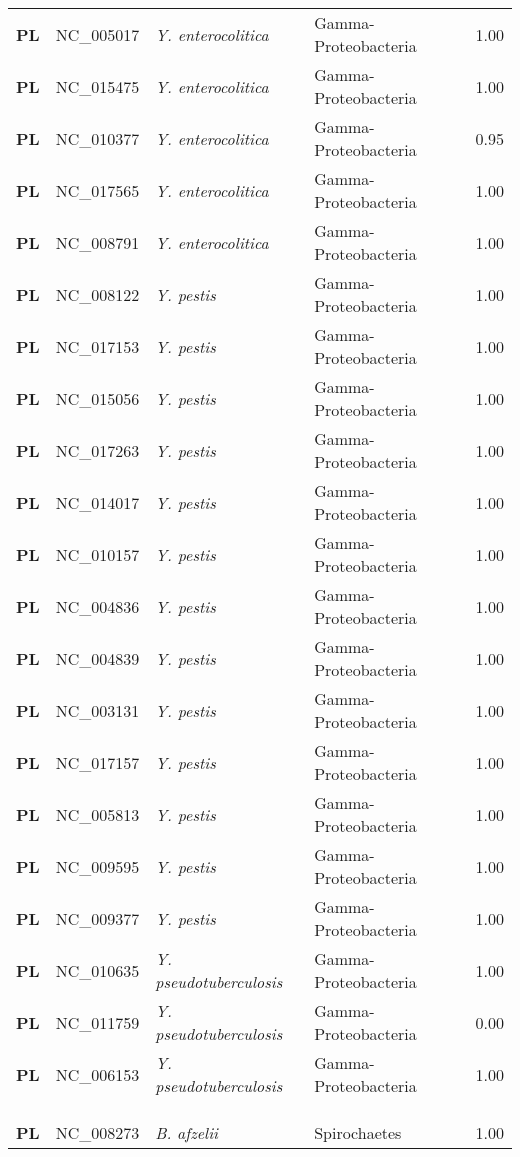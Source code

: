 \begin{adjustwidth}{-3cm}{2cm}
{\begin{supertabular}{>{\bfseries}l|p{0.1\textwidth}p{0.14\textwidth}l|l}
PL & NC\_005017 & \textit{Y. enterocolitica} & Gamma-Proteobacteria & 1.00\\
PL & NC\_015475 & \textit{Y. enterocolitica} & Gamma-Proteobacteria & 1.00\\
PL & NC\_010377 & \textit{Y. enterocolitica} & Gamma-Proteobacteria & 0.95\\
PL & NC\_017565 & \textit{Y. enterocolitica} & Gamma-Proteobacteria & 1.00\\
PL & NC\_008791 & \textit{Y. enterocolitica} & Gamma-Proteobacteria & 1.00\\
PL & NC\_008122 & \textit{Y. pestis} & Gamma-Proteobacteria & 1.00\\
PL & NC\_017153 & \textit{Y. pestis} & Gamma-Proteobacteria & 1.00\\
PL & NC\_015056 & \textit{Y. pestis} & Gamma-Proteobacteria & 1.00\\
PL & NC\_017263 & \textit{Y. pestis} & Gamma-Proteobacteria & 1.00\\
PL & NC\_014017 & \textit{Y. pestis} & Gamma-Proteobacteria & 1.00\\
PL & NC\_010157 & \textit{Y. pestis} & Gamma-Proteobacteria & 1.00\\
PL & NC\_004836 & \textit{Y. pestis} & Gamma-Proteobacteria & 1.00\\
PL & NC\_004839 & \textit{Y. pestis} & Gamma-Proteobacteria & 1.00\\
PL & NC\_003131 & \textit{Y. pestis} & Gamma-Proteobacteria & 1.00\\
PL & NC\_017157 & \textit{Y. pestis} & Gamma-Proteobacteria & 1.00\\
PL & NC\_005813 & \textit{Y. pestis} & Gamma-Proteobacteria & 1.00\\
PL & NC\_009595 & \textit{Y. pestis} & Gamma-Proteobacteria & 1.00\\
PL & NC\_009377 & \textit{Y. pestis} & Gamma-Proteobacteria & 1.00\\
PL & NC\_010635 & \textit{Y. pseudotuberculosis} & Gamma-Proteobacteria & 1.00\\
PL & NC\_011759 & \textit{Y. pseudotuberculosis} & Gamma-Proteobacteria & 0.00\\
PL & NC\_006153 & \textit{Y. pseudotuberculosis} & Gamma-Proteobacteria & 1.00\\
\\
\\
\hline\\
PL & NC\_008273 & \textit{B. afzelii} & Spirochaetes & 1.00\\

\end{supertabular}}
\end{adjustwidth}
